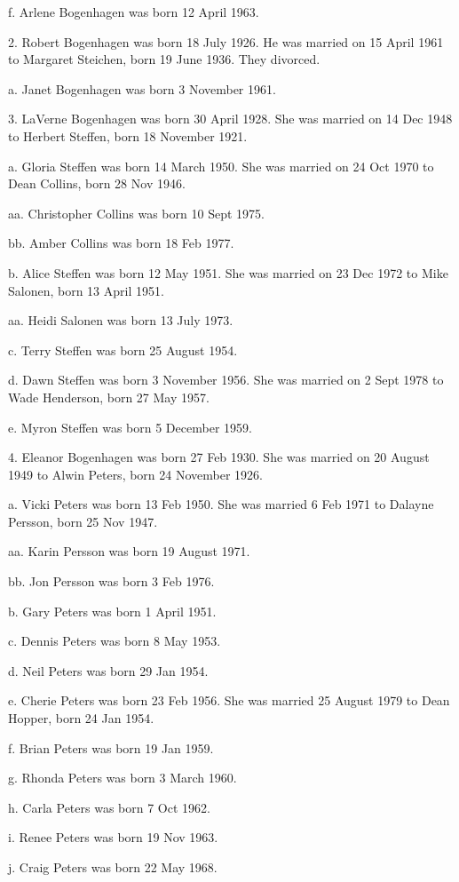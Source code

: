 \documentclass[a4paper]{article}
\begin{document}
f. Arlene Bogenhagen was born 12 April 1963.

2. Robert Bogenhagen was born 18 July 1926.  He was married on 15 April 1961 to Margaret Steichen, born 19 June 1936.  They divorced.		
 
a. Janet Bogenhagen was born 3 November 1961.

3. LaVerne Bogenhagen was born 30 April 1928.  She was married on 14 Dec 1948 to Herbert Steffen, born 18 November 1921.
 
a. Gloria Steffen was born 14 March 1950.  She was married on 24 Oct 1970 to Dean Collins, born 28 Nov 1946.
 
aa. Christopher Collins was born 10 Sept 1975.

bb. Amber Collins was born 18 Feb 1977.

b. Alice Steffen was born 12 May 1951.  She was married on 23 Dec 1972 to Mike Salonen, born 13 April 1951.
 
aa. Heidi Salonen was born 13 July 1973.

c. Terry Steffen was born 25 August 1954.

d. Dawn Steffen was born 3 November 1956.  She was married on 2 Sept 1978 to Wade Henderson, born 27 May 1957.
 
e. Myron Steffen was born 5 December 1959.
 
4. Eleanor Bogenhagen was born 27 Feb 1930.  She was married on 20 August 1949 to Alwin Peters, born 24 November 1926.  
 
a. Vicki Peters was born 13 Feb 1950.  She was married 6 Feb 1971 to Dalayne Persson, born 25 Nov 1947.
 
aa. Karin Persson was born 19 August 1971.

bb. Jon Persson was born 3 Feb 1976.

b. Gary Peters was born 1 April 1951.

c. Dennis Peters was born 8 May 1953.

d. Neil Peters was born 29 Jan 1954.

e. Cherie Peters was born 23 Feb 1956.  She was married 25 August 1979 to Dean Hopper, born 24 Jan 1954.
 
f. Brian Peters was born 19 Jan 1959.

g. Rhonda Peters was born 3 March 1960.

h. Carla Peters was born 7 Oct 1962.

i. Renee Peters was born 19 Nov 1963.

j. Craig Peters was born 22 May 1968.
\end{document}
